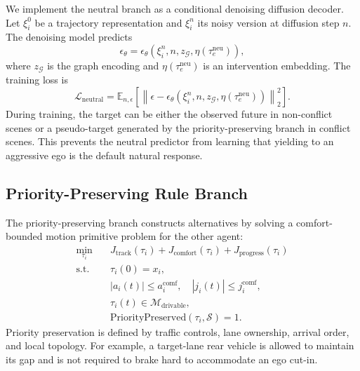 \documentclass[10pt]{article}
\begin{document}
We implement the neutral branch as a conditional denoising diffusion decoder. Let $\xi^0_i$ be a trajectory representation and $\xi^n_i$ its noisy version at diffusion step $n$. The denoising model predicts
\begin{equation}
    \epsilon_\theta
    =
    \epsilon_\theta
    \left(
    \xi^n_i,
    n,
    z_{\mathcal{G}},
    \eta(\tau^{\mathrm{neu}}_e)
    \right),
\end{equation}
where $z_{\mathcal{G}}$ is the graph encoding and $\eta(\tau^{\mathrm{neu}}_e)$ is an intervention embedding. The training loss is
\begin{equation}
    \mathcal{L}_{\mathrm{neutral}}
    =
    \mathbb{E}_{n,\epsilon}
    \left[
    \left\|
    \epsilon
    -
    \epsilon_\theta(\xi^n_i,n,z_{\mathcal{G}},\eta(\tau^{\mathrm{neu}}_e))
    \right\|_2^2
    \right].
\end{equation}
During training, the target can be either the observed future in non-conflict scenes or a pseudo-target generated by the priority-preserving branch in conflict scenes. This prevents the neutral predictor from learning that yielding to an aggressive ego is the default natural response.

\subsection{Priority-Preserving Rule Branch}
\label{app:priority_branch}

The priority-preserving branch constructs alternatives by solving a comfort-bounded motion primitive problem for the other agent:
\begin{equation}
\begin{aligned}
    \min_{\tau_i}\quad
    &
    J_{\mathrm{track}}(\tau_i)
    +
    J_{\mathrm{comfort}}(\tau_i)
    +
    J_{\mathrm{progress}}(\tau_i)\\
    \mathrm{s.t.}\quad
    &
    \tau_i(0)=x_i,\\
    &
    |a_i(t)|\le a^{\mathrm{comf}}_i,\quad
    |j_i(t)|\le j^{\mathrm{comf}}_i,\\
    &
    \tau_i(t)\in\mathcal{M}_{\mathrm{drivable}},\\
    &
    \mathrm{PriorityPreserved}(\tau_i,\mathcal{S})=1 .
\end{aligned}
\end{equation}
Priority preservation is defined by traffic controls, lane ownership, arrival order, and local topology. For example, a target-lane rear vehicle is allowed to maintain its gap and is not required to brake hard to accommodate an ego cut-in.
\end{document}
